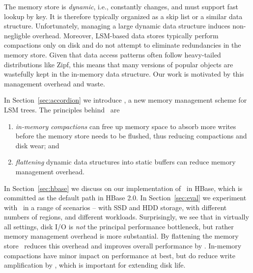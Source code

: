 

The memory store is \emph{dynamic}, i.e., constantly changes, and must support fast lookup by key. 
It is therefore typically organized as a skip list
 or a similar data structure.  Unfortunately, managing a large dynamic data structure induces 
non-negligble  overhead. 
Moreover, 
LSM-based data stores typically perform compactions only on disk and do not attempt to eliminate redundancies in the memory store.
Given that data access patterns often follow heavy-tailed distributions like Zipf,  this means that many versions of popular objects are 
wastefully kept in the in-memory data structure. 
Our work is motivated by this management overhead and waste. 

In Section~\ref{sec:accordion}
we introduce \sys, a new memory management scheme for LSM trees.
The principles behind \sys\ are 
\begin{enumerate}
\item \emph{in-memory compactions} can free up memory space to absorb more writes before the
memory store needs to be flushed, thus reducing compactions and disk wear; and
\item \emph{flattening} dynamic data structures into static buffers can reduce memory management overhead.
\end{enumerate}

In Section~\ref{sec:hbase} we  discuss on our implementation of  \sys\ in HBase, which is committed  as the default path in HBase 2.0. 
In Section~\ref{sec:eval} we experiment with \sys\ in a range of  scenarios -- with SSD and HDD storage, with different numbers
of regions, and different workloads. Surprisingly, we see that in virtually all settings, disk I/O is \emph{not} the principal performance bottleneck,
but rather memory management overhead is more substantial. By flattening the memory store \sys\ reduces this overhead and improves overall performance by . In-memory compactions have minor impact on performance at best, but do reduce 
write amplification by , which is important for extending disk life.






